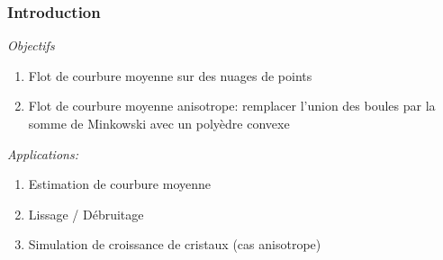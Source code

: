 \documentclass{beamer}
\begin{document}
\begin{frame}
    \frametitle{Introduction}

    \emph{Objectifs}
    \begin{enumerate}
        \item Flot de courbure moyenne sur des nuages de points
        \item Flot de courbure moyenne anisotrope: remplacer l'union des boules
            par la somme de Minkowski avec un polyèdre convexe
    \end{enumerate}

    \emph{Applications:}
    \begin{enumerate}
        \item Estimation de courbure moyenne
        \item Lissage / Débruitage
        \item Simulation de croissance de cristaux (cas anisotrope)
    \end{enumerate}
\end{frame}





\end{document}
